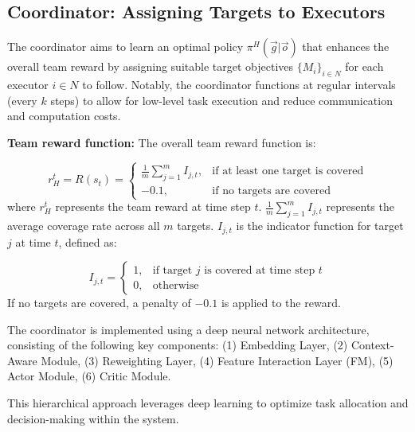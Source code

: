 \documentclass[preprint,12pt]{elsarticle}
\begin{document}
\subsection{Coordinator: Assigning Targets to Executors}
The coordinator aims to learn an optimal policy $\pi^H(\overset{\rightarrow}{g}| \overset{\rightarrow}{o})$  that enhances the overall team reward by assigning suitable target objectives $\{M_i\}_{i\in N}$ for each executor $i\in N$ to follow. Notably, the coordinator functions at regular intervals (every $k$ steps) to allow for low-level task execution and reduce communication and computation costs.


\noindent\textbf{Team reward function:} The overall team reward function is:

\begin{equation}
r_H^t = R(s_t) =
\begin{cases}
\frac{1}{m} \sum_{j=1}^{m} I_{j,t}, & \text{if at least one target is covered} \\
-0.1, & \text{if no targets are covered}
\end{cases}  
\end{equation}
where \( r_H^t \) represents the team reward at time step \( t \). \( \frac{1}{m} \sum_{j=1}^{m} I_{j,t} \) represents the average coverage rate across all \( m \) targets. \( I_{j,t} \) is the indicator function for target \( j \) at time \( t \), defined as:

\[
I_{j,t} =
\begin{cases}
1, & \text{if target } j \text{ is covered at time step } t \\
0, & \text{otherwise}
\end{cases}
\]
If no targets are covered, a penalty of \(-0.1\) is applied to the reward.


The coordinator is implemented using a deep neural network architecture, consisting of the following key components:
(1) Embedding Layer, (2) Context-Aware Module, (3) Reweighting Layer, (4) Feature Interaction Layer (FM), (5) Actor Module, (6) Critic Module.

This hierarchical approach leverages deep learning to optimize task allocation and decision-making within the system.
\end{document}
